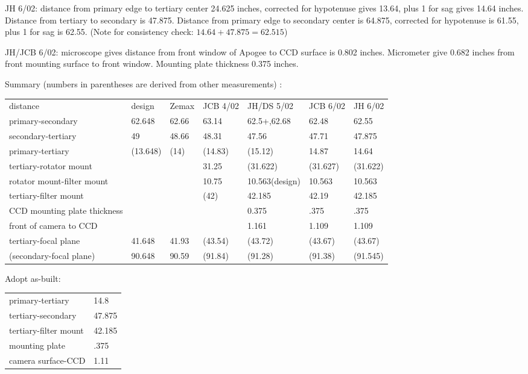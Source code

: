\documentclass{article}[12pt]
\begin{document}
\begin{itemize}
JH 6/02: distance from primary edge to tertiary center 24.625 inches,
corrected for hypotenuse gives 13.64, plus 1 for sag gives 14.64 inches.
Distance from tertiary to secondary is 47.875. Distance from primary edge
to secondary center is 64.875, corrected for hypotenuse is 61.55, plus 1
for sag is 62.55. (Note for consistency check: $14.64+47.875=62.515$)

JH/JCB 6/02: microscope gives distance from front window of Apogee to
CCD surface is 0.802 inches. Micrometer give 0.682 inches from front
mounting surface to front window. Mounting plate thickness 0.375 inches.

Summary (numbers in parentheses are derived from other measurements) :

\begin{center}
\begin{tabular}{lllllll}
distance&design&Zemax&JCB 4/02&JH/DS 5/02&JCB 6/02&JH 6/02\\
primary-secondary&62.648&62.66&63.14&62.5+,62.68&62.48&62.55\\
secondary-tertiary&49&48.66&48.31&47.56&47.71&47.875\\
primary-tertiary&(13.648)&(14)&(14.83)&(15.12)&14.87&14.64\\
tertiary-rotator mount&&&31.25&(31.622)&(31.627)&(31.622)\\
rotator mount-filter mount&&&10.75&10.563(design)&10.563&10.563\\
tertiary-filter mount&&&(42)&42.185&42.19&42.185\\
CCD mounting plate thickness&&&&0.375&.375&.375\\
front of camera to CCD&&&&1.161&1.109&1.109\\
tertiary-focal plane&41.648&41.93&(43.54)&(43.72)&(43.67)&(43.67)\\
(secondary-focal plane)&90.648&90.59&(91.84)&(91.28)&(91.38)&(91.545)
\end{tabular}
\end{center}

Adopt as-built:

\begin{center}
\begin{tabular}{ll}
primary-tertiary&14.8\\
tertiary-secondary&47.875\\
tertiary-filter mount&42.185\\
mounting plate&.375\\
camera surface-CCD&1.11
\end{tabular}
\end{center}


\end{itemize}
\end{document}
